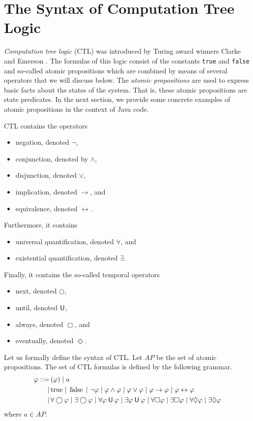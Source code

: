 \documentclass[12pt]{article}
\newcommand{\always}{\Box}
\newcommand{\eventually}{\Diamond}
\newcommand{\nxt}{\bigcirc}
\newcommand{\until}{\mathbin{\sf U}}
\newcommand{\TRUE}{\mbox{\lstinline{true}}}
\newcommand{\FALSE}{\mbox{\lstinline{false}}}
\theoremstyle{definition}
\begin{document}
\title{}
\author{}
\date{\today}
\maketitle

\section{The Syntax of Computation Tree Logic}

\emph{Computation tree logic} (CTL) was introduced by Turing award winners Clarke and Emerson \cite{CE81}.  The formulas of this logic consist of the constants \lstinline{true} and \lstinline{false} and so-called atomic propositions which are combined by means of several operators that we will discuss below.  The \emph{atomic propositions} are used to express basic facts about the states of the system.  That is, these atomic propositions are state predicates.  In the next section, we provide some concrete examples of atomic propositions in the context of Java code.

CTL contains the operators
\begin{itemize}
\item
negation, denoted $\neg$,
\item 
conjunction, denoted by $\wedge$,
\item
disjunction, denoted $\vee$,
\item
implication, denoted $\rightarrow$, and
\item
equivalence, denoted $\leftrightarrow$.
\end{itemize}
Furthermore, it contains
\begin{itemize}
\item 
universal quantification, denoted $\forall$, and
\item
existential quantification, denoted $\exists$.
\end{itemize}
Finally, it contains the so-called temporal operators
\begin{itemize}
\item 
next, denoted $\nxt$,
\item
until, denoted $\until$,
\item
always, denoted $\always$, and
\item
eventually, denoted $\eventually$.
\end{itemize}

Let us formally define the syntax of CTL.  Let $\mathit{AP}$ be the set of atomic propositions.  The set of CTL formulas is defined by the following grammar.
\begin{align*}
\varphi
::= \, & ( \varphi ) 
\mid a\\
\mid\, & \TRUE
\mid \FALSE
\mid \neg \varphi
\mid \varphi \wedge \varphi
\mid \varphi \vee \varphi
\mid \varphi \rightarrow \varphi
\mid \varphi \leftrightarrow \varphi\\
\mid \, & \forall \nxt \varphi
\mid \exists \nxt \varphi
\mid \forall \varphi \until \varphi
\mid \exists \varphi \until \varphi
\mid \forall \always \varphi
\mid \exists \always \varphi
\mid \forall \eventually \varphi
\mid \exists \eventually \varphi
\end{align*}
where $a \in \mathit{AP}$.  
\end{document}
